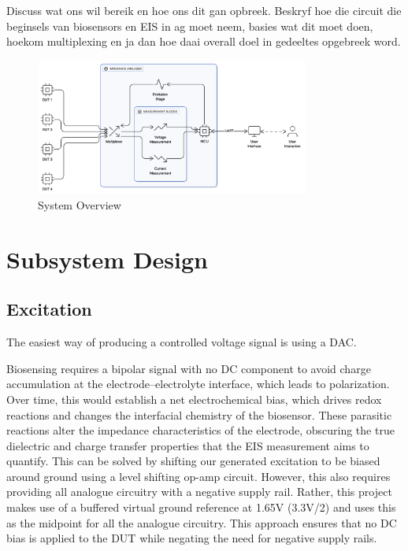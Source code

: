 Discuss wat ons wil bereik en hoe ons dit gan opbreek. Beskryf hoe die circuit die beginsels van biosensors en EIS in ag moet neem, basies wat dit moet doen, hoekom multiplexing en ja dan hoe daai overall doel in gedeeltes opgebreek word.

\begin{figure}[H]
    \centering
    \includegraphics[width=0.8\textwidth]{SystemOverview.png}
    \caption{System Overview}
    \label{fig:system_overview} 
\end{figure}

\section{Subsystem Design}

\subsection{Excitation}\label{subsec:design_excitation}
The easiest way of producing a controlled voltage signal is using a \ac{DAC}. 

Biosensing requires a bipolar signal with no DC component to avoid charge accumulation at the electrode–electrolyte interface, which leads to polarization. Over time, this would establish a net electrochemical bias, which drives redox reactions and changes the interfacial chemistry of the biosensor. These parasitic reactions alter the impedance characteristics of the electrode, obscuring the true dielectric and charge transfer properties that the EIS measurement aims to quantify. This can be solved by shifting our generated excitation to be biased around ground using a level shifting op-amp circuit. However, this also requires providing all analogue circuitry with a negative supply rail. Rather, this project makes use of a buffered virtual ground reference at 1.65V (3.3V/2) and uses this as the midpoint for all the analogue circuitry. This approach ensures that no DC bias is applied to the \ac{DUT} while negating the need for negative supply rails.

